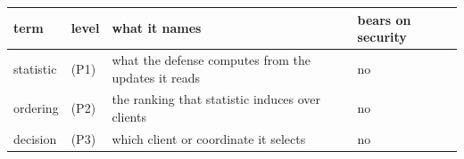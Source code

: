 \documentclass{article}
\begin{document}
\begin{center}\small\vspace{-6pt}\renewcommand{\arraystretch}{0.9}
\begin{tabular}{@{}llll@{}}
\toprule
term & level & what it names & bears on security \\
\midrule
statistic & (P1) & what the defense computes from the updates it reads & no \\
ordering & (P2) & the ranking that statistic induces over clients & no \\
decision & (P3) & which client or coordinate it selects & no \\

\end{tabular}
\end{center}
\end{document}
